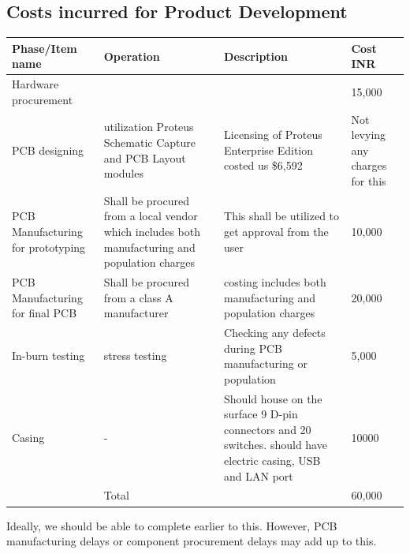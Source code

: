 \documentclass{FR16}
\begin{document}
\subsection{Costs incurred for Product Development}
\begin{center}
\begin{tabular}{||p{3 cm} ||p{4 cm}|| p{5 cm}|| p{2 cm}|| }
\arrayrulecolor{Azzurro}
\hline
\hline

{\bfseries Phase/Item name } & {\bfseries Operation}& {\bfseries Description} & {\bfseries Cost INR} \\

\hline
\hline
Hardware procurement & & &15,000 \\
\hline
\hline
PCB designing & utilization Proteus Schematic Capture and PCB Layout modules  & Licensing of Proteus Enterprise Edition costed us \$6,592& Not levying any charges for this\\ 
\hline 
\hline
PCB Manufacturing for prototyping & Shall be procured from a local vendor which includes both manufacturing and population charges & This shall be utilized to get approval from the user& 10,000\\
\hline 
\hline
PCB Manufacturing for final PCB  & Shall be procured from a class A manufacturer & costing includes both manufacturing and population charges&20,000\\
\hline 
\hline
In-burn testing & stress testing & Checking any defects during PCB manufacturing or population&5,000 \\
\hline 
\hline
Casing & - & Should house on the surface 9 D-pin connectors and 20 switches. should have electric casing, USB and LAN port & 10000\\
\hline
\hline
& Total & & 60,000
 
 \end{tabular}
\end{center}
Ideally, we should be able to complete earlier to this. However, PCB manufacturing delays or component procurement delays may add up to this.


\newpage
\end{document}
